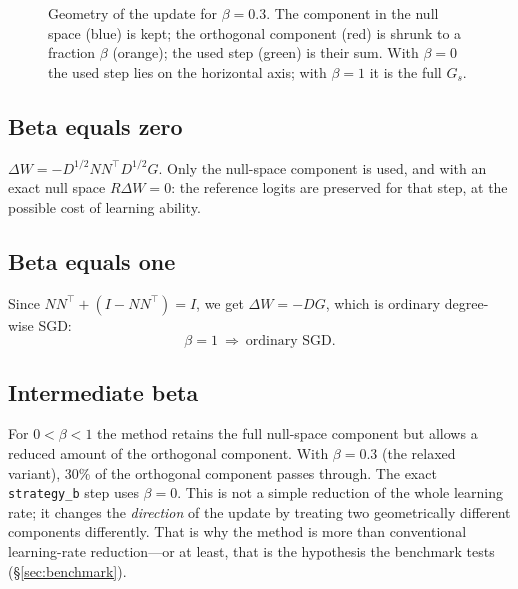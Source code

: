 \documentclass[11pt,a4paper]{article}
\newcommand{\code}[1]{\texttt{#1}}
\begin{document}
\begin{figure}[h]
\centering
{}
\caption{Geometry of the update for $\beta=0.3$. The component in the null space (blue) is kept; the orthogonal component (red) is shrunk to a fraction $\beta$ (orange); the used step (green) is their sum. With $\beta=0$ the used step lies on the horizontal axis; with $\beta=1$ it is the full $G_s$.}
\end{figure}

\subsection{Beta equals zero}

$\Delta W=-D^{1/2}NN^\top D^{1/2}G$. Only the null-space component is used, and with an exact null space $\boxed{R\Delta W=0}$: the reference logits are preserved for that step, at the possible cost of learning ability.

\subsection{Beta equals one}

Since $NN^\top+(I-NN^\top)=I$, we get $\Delta W=-DG$, which is ordinary degree-wise SGD:
\[
\boxed{\beta=1\ \Longrightarrow\ \text{ordinary SGD}}.
\]

\subsection{Intermediate beta}

For $0<\beta<1$ the method retains the full null-space component but allows a reduced amount of the orthogonal component. With $\beta=0.3$ (the relaxed variant), 30\% of the orthogonal component passes through. The exact \code{strategy\_b} step uses $\beta=0$. This is not a simple reduction of the whole learning rate; it changes the \emph{direction} of the update by treating two geometrically different components differently. That is why the method is more than conventional learning-rate reduction---or at least, that is the hypothesis the benchmark tests (\S\ref{sec:benchmark}).
\end{document}
